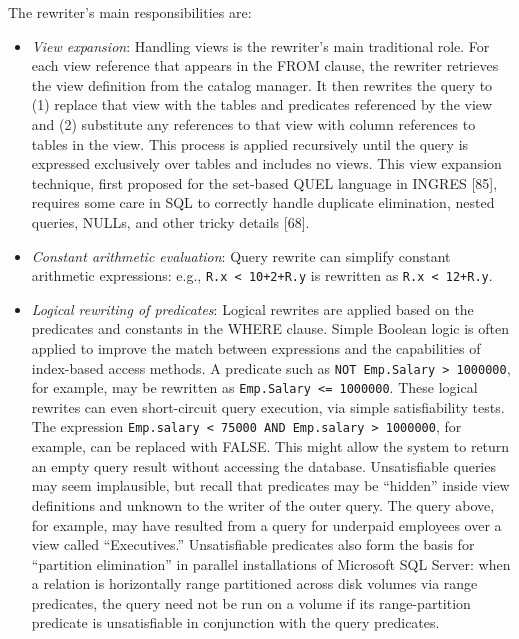 \documentclass[a4paper,11pt,twoside,openright]{book}
\begin{document}
The rewriter's main responsibilities are:

\begin{itemize}
\item
  \emph{View expansion}: Handling views is the rewriter's main
  traditional role. For each view reference that appears in the FROM
  clause, the rewriter retrieves the view definition from the catalog
  manager. It then rewrites the query to (1) replace that view with the
  tables and predicates referenced by the view and (2) substitute any
  references to that view with column references to tables in the view.
  This process is applied recursively until the query is expressed
  exclusively over tables and includes no views. This view expansion
  technique, first proposed for the set-based QUEL language in INGRES
  {[}85{]}, requires some care in SQL to correctly handle duplicate
  elimination, nested queries, NULLs, and other tricky details {[}68{]}.
\item
  \emph{Constant arithmetic evaluation}: Query rewrite can simplify
constant arithmetic expressions: e.g., \texttt{R.x < 10+2+R.y} is
rewritten as \texttt{R.x < 12+R.y}.
\item
  \emph{Logical rewriting of predicates}: Logical rewrites are applied
  based on the predicates and constants in the WHERE clause. Simple
  Boolean logic is often applied to improve the match between
  expressions and the capabilities of index-based access methods. A
  predicate such as \texttt{NOT Emp.Salary > 1000000}, for example,
  may be rewritten as \texttt{Emp.Salary <= 1000000}. These logical
  rewrites can even short-circuit query execution, via simple
		satisfiability tests. The expression \texttt{Emp.salary \textless{} 75000 AND
		Emp.salary \textgreater{} 1000000}, for example, can be replaced with
  FALSE. This might allow the system to return an empty query result
  without accessing the database. Unsatisfiable queries may seem
  implausible, but recall that predicates may be ``hidden'' inside view
  definitions and unknown to the writer of the outer query. The query
  above, for example, may have resulted from a query for underpaid
  employees over a view called ``Executives.'' Unsatisfiable predicates
  also form the basis for ``partition elimination'' in parallel
  installations of Microsoft SQL Server: when a relation is horizontally
  range partitioned across disk volumes via range predicates, the query
  need not be run on a volume if its range-partition predicate is
  unsatisfiable in conjunction with the query predicates.


\end{itemize}
\end{document}
